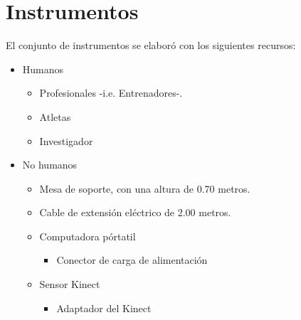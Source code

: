 \section{Instrumentos}\label{ins}
El conjunto de instrumentos se elabor\'o con los  siguientes recursos:
\begin{itemize}
\item Humanos
	\begin{itemize}
	\item Profesionales -i.e. Entrenadores-.
	\item Atletas
	\item Investigador
	\end{itemize}
\item No humanos
	\begin{itemize}
	\item Mesa de soporte, con una altura de 0.70 metros.
	\item Cable de extensi\'on el\'ectrico de 2.00 metros. 
	\item Computadora p\'ortatil
		\begin{itemize}
		\item Conector de carga de alimentaci\'on
		\end{itemize}
	\item Sensor Kinect
		\begin{itemize}
		\item Adaptador del Kinect
		\end{itemize}
	\end{itemize}
\end{itemize}
